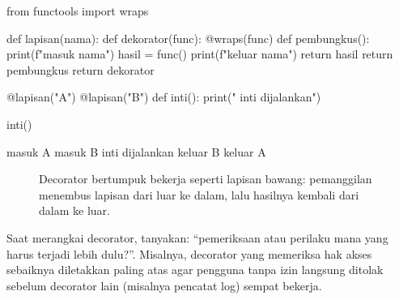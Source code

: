 \begin{kode}
from functools import wraps

def lapisan(nama):
    def dekorator(func):
        @wraps(func)
        def pembungkus():
            print(f"masuk  {nama}")
            hasil = func()
            print(f"keluar {nama}")
            return hasil
        return pembungkus
    return dekorator

@lapisan("A")
@lapisan("B")
def inti():
    print("    inti dijalankan")

inti()
\end{kode}

\begin{keluaran}
masuk  A
masuk  B
    inti dijalankan
keluar B
keluar A
\end{keluaran}

\begin{figure}[htbp]
\centering
{}
\caption{Decorator bertumpuk bekerja seperti lapisan bawang: pemanggilan menembus lapisan dari luar ke dalam, lalu hasilnya kembali dari dalam ke luar.}
\end{figure}

\begin{tips}
Saat merangkai decorator, tanyakan: ``pemeriksaan atau perilaku mana yang harus terjadi lebih dulu?''. Misalnya, decorator yang memeriksa hak akses sebaiknya diletakkan paling atas agar pengguna tanpa izin langsung ditolak sebelum decorator lain (misalnya pencatat log) sempat bekerja.
\end{tips}

